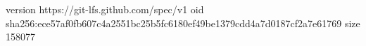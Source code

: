 version https://git-lfs.github.com/spec/v1
oid sha256:ece57af0fb607c4a2551bc25b5fc6180ef49be1379cdd4a7d0187cf2a7e61769
size 158077
